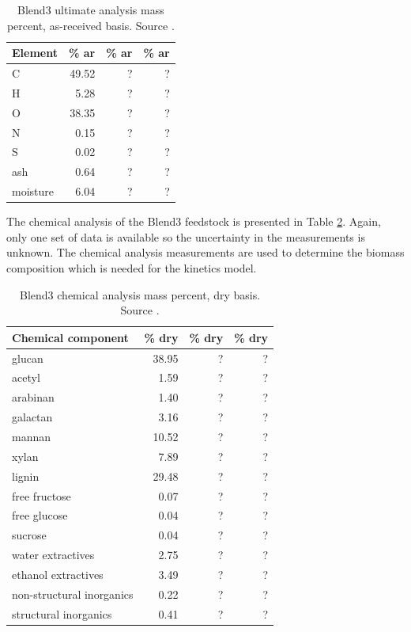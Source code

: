 \begin{table}[H]
    \centering
    \caption{Blend3 ultimate analysis mass percent, as-received basis. Source \cite{Choratch-2017}.}
    \label{tab:blend3-ult}
    \begin{tabular}{lrrr}
        \toprule
        Element & \% ar & \% ar & \% ar \\
        \midrule
        C        & 49.52   & ? & ? \\
        H        & 5.28    & ? & ? \\
        O        & 38.35   & ? & ? \\
        N        & 0.15    & ? & ? \\
        S        & 0.02    & ? & ? \\
        ash      & 0.64    & ? & ? \\
        moisture & 6.04    & ? & ? \\
        \bottomrule
    \end{tabular}
\end{table}

The chemical analysis of the Blend3 feedstock is presented in Table \ref{tab:blend3-chem-analysis}. Again, only one set of data is available so the uncertainty in the measurements is unknown. The chemical analysis measurements are used to determine the biomass composition which is needed for the kinetics model.

\begin{table}[H]
    \centering
    \caption{Blend3 chemical analysis mass percent, dry basis. Source \cite{Starace-2020}.}
    \label{tab:blend3-chem-analysis}
    \begin{tabular}{lrrr}
        \toprule
        Chemical component & \% dry & \% dry & \% dry \\
        \midrule
        glucan                    & 38.95 & ? & ? \\
        acetyl                    & 1.59  & ? & ? \\
        arabinan                  & 1.40  & ? & ? \\
        galactan                  & 3.16  & ? & ? \\
        mannan                    & 10.52 & ? & ? \\
        xylan                     & 7.89  & ? & ? \\
        lignin                    & 29.48 & ? & ? \\
        free fructose             & 0.07  & ? & ? \\
        free glucose              & 0.04  & ? & ? \\
        sucrose                   & 0.04  & ? & ? \\
        water extractives         & 2.75  & ? & ? \\
        ethanol extractives       & 3.49  & ? & ? \\
        non-structural inorganics & 0.22  & ? & ? \\
        structural inorganics     & 0.41  & ? & ? \\
        \bottomrule
    \end{tabular}
\end{table}

